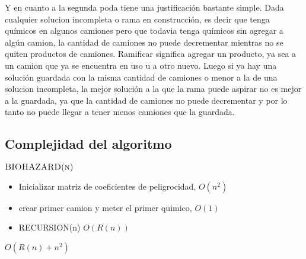 Y en cuanto a la segunda poda tiene una justificaci\'on bastante simple. Dada cualquier solucion incompleta o rama en construcci\'on, es decir que tenga qu\'imicos en algunos camiones pero que todavia tenga qu\'imicos sin agregar a alg\'un camion, la cantidad de camiones no puede decrementar mientras no se quiten productos de camiones. Ramificar significa agregar un producto, ya sea a un camion que ya se encuentra en uso u a otro nuevo. Luego si ya hay una soluci\'on guardada con la misma cantidad de camiones o menor a la de una solucion incompleta, la mejor soluci\'on a la que la rama puede aspirar no es mejor a la guardada, ya que la cantidad de camiones no puede decrementar y por lo tanto no puede llegar a tener menos camiones que la guardada.


\subsection{Complejidad del algoritmo}




$\textnormal{\scshape BIOHAZARD(n)}$
\begin{itemize}
	\item Inicializar matriz de coeficientes de peligrocidad,		$O(n^2)$
	\item crear primer camion y meter el primer quimico,		$O(1)$
	\item RECURSION(n)										$O(R(n))$
\end{itemize}		$O(R(n) + n^2 )$ 



